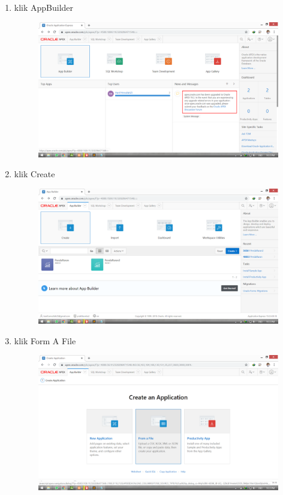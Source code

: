 \documentclass[11pt]{article}
\begin{document}
\begin{enumerate}
\item klik AppBuilder
\begin{figure}
        \centerline{\includegraphics[scale=0.1]{img/2appbuilder.png}}
        \caption{}
		\label{langkah3}
\end{figure}

\item klik Create
\begin{figure}
        \centerline{\includegraphics[scale=0.1]{img/3create.png}}
        \caption{}
		\label{langkah4}
\end{figure}

\item klik Form A File
\begin{figure}
        \centerline{\includegraphics[scale=0.1]{img/4formfile.png}}
        \caption{}
		\label{langkah5}
\end{figure}


\end{enumerate}
\end{document}
